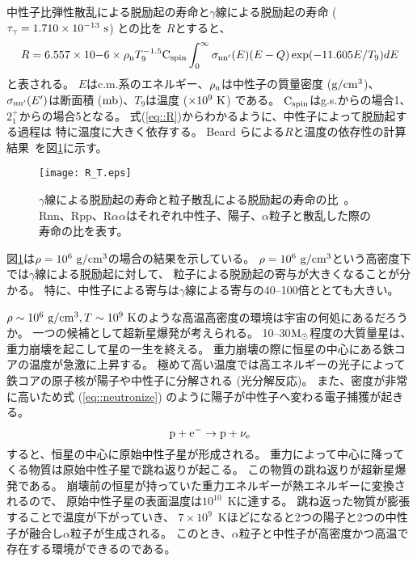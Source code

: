 \documentclass[../master]{subfiles}
\begin{document}
中性子比弾性散乱による脱励起の寿命と$\gamma$線による脱励起の寿命 ($\tau_{\gamma} = 1.710\times10^{-13}~{\rm s}$) との比を
$R$とすると、
\begin{equation}
  R = 6.557\times10{-6}\times\rho_{\rm n}T_{9}^{-1.5}{\rm C}_{{\rm spin}}
  \int^{\infty}_{0}\sigma_{\rm nn'}(E)(E-Q)\exp(-11.605E/T_{9})dE
  \label{eq::R}
\end{equation}
と表される。
$E$はc.m.系のエネルギー、$\rho_{\rm n}$は中性子の質量密度 (${\rm g}/{\rm cm}^{3}$)、
$\sigma_{\rm nn'}(E')$は断面積 (${\rm mb}$)、$T_{9}$は温度 ($\times10^{9}~{\rm K}$) である。
${\rm C}_{{\rm spin}}$はg.s.からの場合1、
$2_{1}^{+}$からの場合5となる。
式(\ref{eq::R})からわかるように、中性子によって脱励起する過程は
特に温度に大きく依存する。
Beard らによる$R$と温度の依存性の計算結果~\cite{hotdensemedium}を図\ref{fig::R}に示す。
\begin{figure}
  \centering
  \texttt{[image: R\_T.eps]}
  \caption[$\gamma$線による脱励起の寿命と粒子散乱による脱励起の寿命の比。]
          {$\gamma$線による脱励起の寿命と粒子散乱による脱励起の寿命の比~\cite{hotdensemedium}。
    Rnn、Rpp、R$\alpha\alpha$はそれぞれ中性子、陽子、$\alpha$粒子と散乱した際の寿命の比を表す。}
  \label{fig::R}
\end{figure}
図\ref{fig::R}は$\rho = 10^{6}~{\rm g}/{\rm cm}^{3}$の場合の結果を示している。
$\rho = 10^{6}~{\rm g}/{\rm cm}^{3}$という高密度下では$\gamma$線による脱励起に対して、
粒子による脱励起の寄与が大きくなることが分かる。
特に、中性子による寄与は$\gamma$線による寄与の40--100倍ととても大きい。

$\rho\sim10^{6}~{\rm g}/{\rm cm^{3}}, T\sim10^{9}~{\rm K}$のような高温高密度の環境は宇宙の何処にあるだろうか。
一つの候補として超新星爆発が考えられる。
10--30$\rm M_{\odot}$程度の大質量星は、重力崩壊を起こして星の一生を終える。
重力崩壊の際に恒星の中心にある鉄コアの温度が急激に上昇する。
極めて高い温度では高エネルギーの光子によって鉄コアの原子核が陽子や中性子に分解される (光分解反応)。
また、密度が非常に高いため式 (\ref{eq::neutronize}) のように陽子が中性子へ変わる電子捕獲が起きる。
\begin{equation}
  {\rm p}+{\rm e}^{-} \rightarrow {\rm p}+\nu_{\rm e}
  \label{eq::neutronize}
\end{equation}
すると、恒星の中心に原始中性子星が形成される。
重力によって中心に降ってくる物質は原始中性子星で跳ね返りが起こる。
この物質の跳ね返りが超新星爆発である。
崩壊前の恒星が持っていた重力エネルギーが熱エネルギーに変換されるので、
原始中性子星の表面温度は$10^10$~Kに達する。
跳ね返った物質が膨張することで温度が下がっていき、
$7\times10^9$~Kほどになると2つの陽子と2つの中性子が融合し$\alpha$粒子が生成される。
このとき、$\alpha$粒子と中性子が高密度かつ高温で存在する環境ができるのである。
\end{document}
